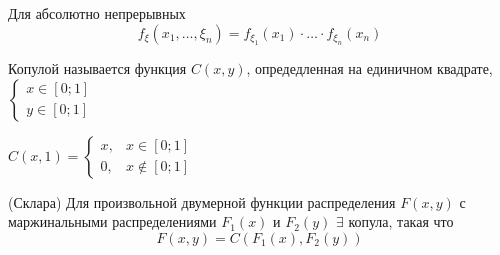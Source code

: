\documentclass[a4paper, 10pt]{article}
\begin{document}
 Для абсолютно непрерывных
\begin{equation*}
    f_{\xi}(x_1,\ldots,\xi_n)=f_{\xi_1}(x_1)\cdot\ldots\cdot f_{\xi_n}(x_n)
\end{equation*}

 Копулой называется функция $C(x,y)$, опредедленная на единичном квадрате, $\begin{cases}
    x\in[0;1]\\
    y\in[0;1]
\end{cases}$

$C(x,1)=\begin{cases}
    x,&x\in[0;1]\\
    0,&x\not\in[0;1]
\end{cases}$

\theorem (Склара) Для произвольной двумерной функции распределения $F(x,y)$ с маржинальными распределениями $F_1(x)$ и $F_2(y)$ $\exists$ копула, такая что
\begin{equation*}
    F(x,y)=C(F_1(x),F_2(y))
\end{equation*}
\end{document}
